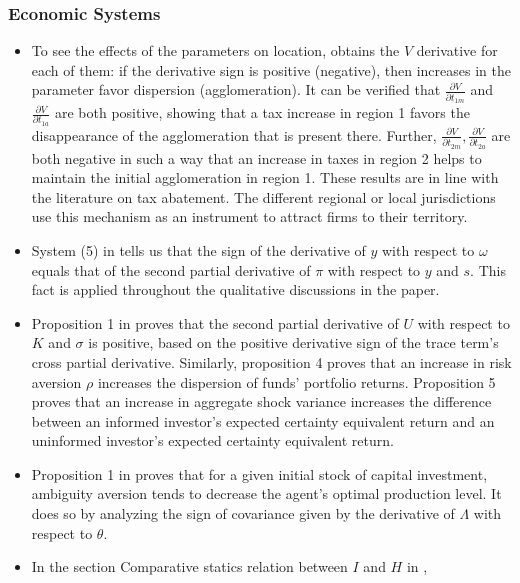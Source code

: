 \documentclass[11pt]{book}
\begin{document}
\subsubsection{Economic Systems}
\begin{itemize}
\item To see the effects of the parameters on location, \cite{lanaspa2001public}
obtains the $V$ derivative for each of them: if the derivative sign
is positive (negative), then increases in the parameter favor dispersion
(agglomeration). It can be verified that $\frac{\partial V}{\partial t_{1m}}$
and $\frac{\partial V}{\partial t_{1a}}$ are both positive, showing
that a tax increase in region 1 favors the disappearance of the agglomeration
that is present there. Further, $\frac{\partial V}{\partial t_{2m}},\frac{\partial V}{\partial t_{2a}}$
are both negative in such a way that an increase in taxes in region
2 helps to maintain the initial agglomeration in region 1. These results
are in line with the literature on tax abatement. The different regional
or local jurisdictions use this mechanism as an instrument to attract
firms to their territory.
\item System (5) in \cite{carriquiry2007reputations}
tells us that the sign of the derivative of $y$ with respect to $\omega$
equals that of the second partial derivative of $\pi$ with respect
to $y$ and $s$. This fact is applied throughout the qualitative
discussions in the paper.
\item Proposition 1 in \cite{kacperczyk2009rational}
proves that the second partial derivative of $U$ with respect to
$K$ and $\sigma$ is positive, based on the positive derivative sign
of the trace term's cross partial derivative. Similarly, proposition
4 proves that an increase in risk aversion $\rho$ increases the dispersion
of funds' portfolio returns. Proposition 5 proves that an increase
in aggregate shock variance increases the difference between an informed
investor's expected certainty equivalent return and an uninformed
investor's expected certainty equivalent return.
\item Proposition 1 in \cite{jouvet2012irreversible}
proves that for a given initial stock of capital investment, ambiguity
aversion tends to decrease the agent's optimal production level. It
does so by analyzing the sign of covariance given by the derivative
of $\Lambda$ with respect to $\theta$.
\item In the section \textquotedbl Comparative statics relation between
$I$ and $H$\textquotedbl{} in \cite{laporte2015should},

\end{itemize}
\end{document}
